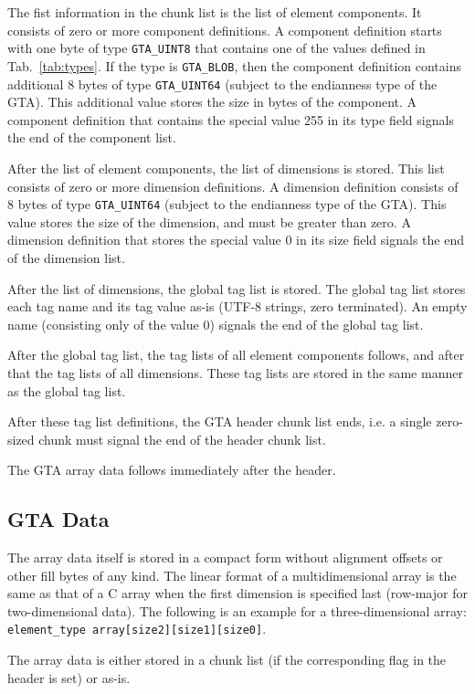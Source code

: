 \documentclass[a4paper,11pt]{article}
\newcommand{\code}[1]{\texttt{#1}}
\begin{document}
The fist information in the chunk list is the list of element components. It
consists of zero or more component definitions. A component definition starts
with one byte of type \code{GTA\_UINT8} that contains one of the values
defined in Tab.~\ref{tab:types}. If the type is \code{GTA\_BLOB}, then the
component definition contains additional 8 bytes of type \code{GTA\_UINT64}
(subject to the endianness type of the GTA). This additional value stores the
size in bytes of the component. A component definition that contains the
special value 255 in its type field signals the end of the component list.

After the list of element components, the list of dimensions is stored.  This
list consists of zero or more dimension definitions. A dimension definition
consists of 8 bytes of type \code{GTA\_UINT64} (subject to the endianness type
of the GTA). This value stores the size of the dimension, and must be greater
than zero. A dimension definition that stores the special value 0 in its size
field signals the end of the dimension list.

After the list of dimensions, the global tag list is stored.  The global tag
list stores each tag name and its tag value as-is (\mbox{UTF-8} strings, zero
terminated). An empty name (consisting only of the value 0) signals
the end of the global tag list.

After the global tag list, the tag lists of all element components follows, and
after that the tag lists of all dimensions. These tag lists are stored in the
same manner as the global tag list.

After these tag list definitions, the GTA header chunk list ends, i.e. a
single zero-sized chunk must signal the end of the header chunk list.

The GTA array data follows immediately after the header.


\subsection{GTA Data}
\label{sec:gta-data}

The array data itself is stored in a compact form without alignment offsets or
other fill bytes of any kind. The linear format of a multidimensional array is
the same as that of a C array when the first dimension is specified last
(row-major for two-dimensional data). The following is an example for a
three-dimensional array: \code{element\_type array[size2][size1][size0]}.

The array data is either stored in a chunk list (if the corresponding flag in
the header is set) or as-is.
\end{document}
